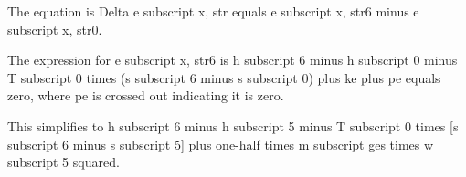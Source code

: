 The equation is Delta e subscript x, str equals e subscript x, str6 minus e subscript x, str0.

The expression for e subscript x, str6 is h subscript 6 minus h subscript 0 minus T subscript 0 times (s subscript 6 minus s subscript 0) plus ke plus pe equals zero, where pe is crossed out indicating it is zero.

This simplifies to h subscript 6 minus h subscript 5 minus T subscript 0 times [s subscript 6 minus s subscript 5] plus one-half times m subscript ges times w subscript 5 squared.